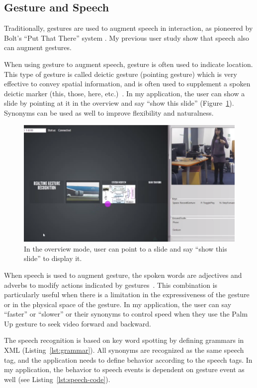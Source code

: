 \subsection{Gesture and Speech}
Traditionally, gestures are used to augment speech in interaction, as pioneered
by Bolt's ``Put That There'' system \cite{Bolt80}. My previous user study
\cite{yin10thesis} show that speech also can augment gestures.

When using gesture to augment speech, gesture is often used to indicate
location. This type of gesture is called deictic gesture (pointing gesture)
which is very effective to convey spatial information, and is often used to
supplement a spoken deictic marker (this, those, here, etc.)~\cite{oviatt97}. In
my application, the user can show a slide by pointing at it in the overview and
say ``show this slide'' (Figure~\ref{fig:point-overview}). Synonyms can be used
as well to improve flexibility and naturalness.

\begin{figure}[tbh]
\centering
\includegraphics[width=\columnwidth]{figures/point_overview.PNG}
\caption{In the overview mode, user can point to a slide and say ``show this
slide'' to display it.}
\label{fig:point-overview}
\end{figure}

When speech is used to augment gesture, the spoken words are adjectives and
adverbs to modify actions indicated by gestures~\cite{yin10thesis}. This
combination is particularly useful when there is a limitation in the
expressiveness of the gesture or in the physical space of the gesture. In my
application, the user can say ``faster'' or ``slower'' or their synonyms to
control speed when they use the Palm Up gesture to seek video forward and
backward.

The speech recognition is based on key word spotting by defining grammars in
XML (Listing~\ref{lst:grammar}). All synonyms are recognized as the same speech
tag, and the application needs to define behavior according to the speech tags. In my application, the behavior to speech
events is dependent on gesture event as well (see
Listing~\ref{lst:speech-code}).

